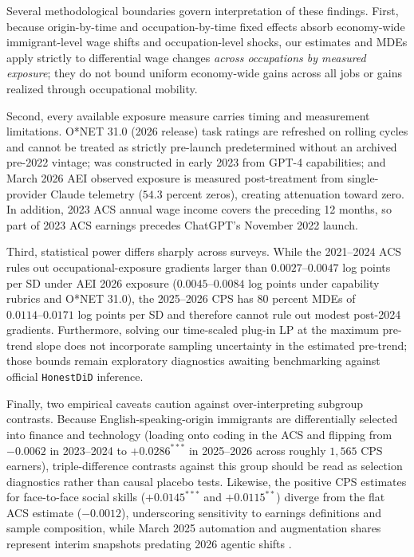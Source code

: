 \documentclass[11pt]{amsart}
\begin{document}
Several methodological boundaries govern interpretation of these findings. First, because origin-by-time and occupation-by-time fixed effects absorb economy-wide immigrant-level wage shifts and occupation-level shocks, our estimates and MDEs apply strictly to differential wage changes \emph{across occupations by measured exposure}; they do not bound uniform economy-wide gains across all jobs or gains realized through occupational mobility.

Second, every available exposure measure carries timing and measurement limitations. O*NET 31.0 (2026 release) task ratings are refreshed on rolling cycles and cannot be treated as strictly pre-launch predetermined without an archived pre-2022 vintage; \citet{Eloundou2024} was constructed in early 2023 from GPT-4 capabilities; and March 2026 AEI observed exposure \citep{MassenkoffMcCrory2026} is measured post-treatment from single-provider Claude telemetry ($54.3$ percent zeros), creating attenuation toward zero. In addition, 2023 ACS annual wage income covers the preceding 12 months, so part of 2023 ACS earnings precedes ChatGPT's November 2022 launch.

Third, statistical power differs sharply across surveys. While the 2021--2024 ACS rules out occupational-exposure gradients larger than $0.0027\text{--}0.0047$ log points per SD under AEI 2026 exposure ($0.0045\text{--}0.0084$ log points under capability rubrics and O*NET 31.0), the 2025--2026 CPS has 80 percent MDEs of $0.0114\text{--}0.0171$ log points per SD and therefore cannot rule out modest post-2024 gradients. Furthermore, solving our time-scaled plug-in LP at the maximum pre-trend slope does not incorporate sampling uncertainty in the estimated pre-trend; those bounds remain exploratory diagnostics awaiting benchmarking against official \texttt{HonestDiD} inference.

Finally, two empirical caveats caution against over-interpreting subgroup contrasts. Because English-speaking-origin immigrants are differentially selected into finance and technology (loading onto coding in the ACS and flipping from $-0.0062$ in 2023--2024 to $+0.0286^{***}$ in 2025--2026 across roughly $1{,}565$ CPS earners), triple-difference contrasts against this group should be read as selection diagnostics rather than causal placebo tests. Likewise, the positive CPS estimates for face-to-face social skills ($+0.0145^{***}$ and $+0.0115^{**}$) diverge from the flat ACS estimate ($-0.0012$), underscoring sensitivity to earnings definitions and sample composition, while March 2025 automation and augmentation shares \citep{Handa2025} represent interim snapshots predating 2026 agentic shifts \citep{Appel2026, Massenkoff2026a, Massenkoff2026b}.
\end{document}
